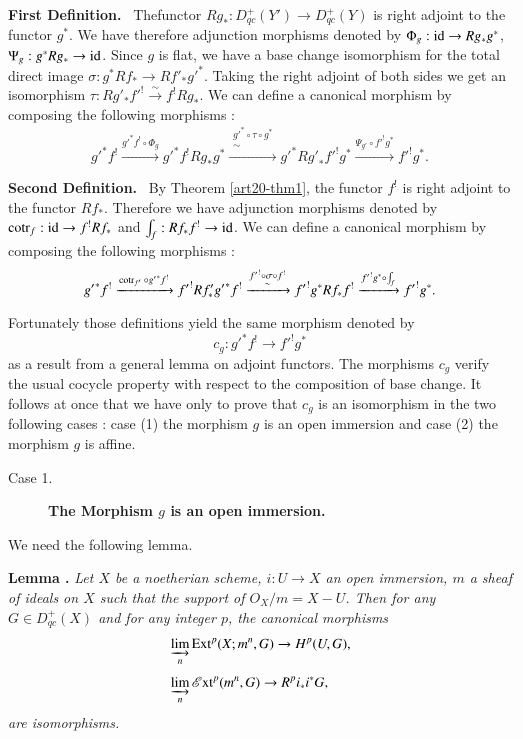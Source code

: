 \medskip
\noindent
{\bf First Definition.}~ The\pageoriginale functor $Rg_{*}:D^{+}_{qc}(Y')\to D^{+}_{qc}(Y)$ is right adjoint to the functor $g^{*}$. We have therefore adjunction morphisms denoted by $\Phi_{g}:\operatorname{\mathrm{id}}\to Rg_{*}g^{*}$, $\Psi_{g}:g^{*}Rg_{*}\to \operatorname{\mathrm{id}}$. Since $g$ is flat, we have a base change isomorphism for the total direct image $\sigma : g^{*}Rf_{*}\to Rf'_{*}{g'}^{*}$. Taking the right adjoint of both sides we get an isomorphism $\tau : Rg'_{*}{f'}^{!}\xrightarrow{\sim}f^{!}Rg_{*}$. We can define a canonical morphism by composing the following morphisms :
$$
{g'}^{*}f^{!}\xrightarrow{{g'}^{*}f^{!}\circ \Phi_{g}}{g'}^{*}f^{!}Rg_{*}g^{*}\xrightarrow{\substack{{g'}^{*}\circ \tau\circ g^{*}\\ \sim}} {g'}^{*}R{g'}_{*}{f'}^{!}g^{*}\xrightarrow{\Psi_{g'}\circ {f'}^{!}g^{*}}{f'}^{!}g^{*}.
$$

\noindent
{\bf Second Definition.}~ By Theorem \ref{art20-thm1}, the functor $f^{!}$ is right adjoint to the functor $Rf_{*}$. Therefore we have adjunction morphisms denoted by $\operatorname{\mathrm{cotr}}_{f}:\operatorname{\mathrm{id}}\to f^{!}Rf_{*}$ and $\int_{f}:Rf_{*}f^{!}\to \operatorname{\mathrm{id}}$. We can define a canonical morphism by composing the following morphisms :
$$
{g'}^{*}f^{!}\xrightarrow{\operatorname{\mathrm{cotr}}_{f'}\circ {g'}^{*}f^{!}}{f'}^{!}Rf'_{*}{g'}^{*}f^{!}\xrightarrow{\substack{{f'}^{!}\circ \sigma \circ f^{!}\\ \sim}} {f'}^{!}g^{*}Rf_{*}f^{!}
\xrightarrow{{f'}^{!}g^{*}\circ \int_{f}}{f'}^{!}g^{*}.
$$

Fortunately those definitions yield the same morphism denoted by
$$
c_{g}:{g'}^{*}f^{!}\to {f'}^{!}g^{*}
$$
as a result from a general lemma on adjoint functors. The morphisms $c_{g}$ verify the usual cocycle property with respect to the composition of base change. It follows at once that we have only to prove that $c_{g}$ is an isomorphism in the two following cases : case (1) the morphism $g$ is an open immersion and case (2) the morphism $g$ is affine.

\eject

\begin{description}
\item[Case 1.] {\bf The Morphism \boldmath$g$ is an open immersion.}
\end{description}

We need the following lemma.

\medskip
\noindent
{\bf Lemma .\label{art20-sec2-lem2}}
{\em Let $X$ be a noetherian scheme, $i:U\to X$ an open immersion, $m$ a sheaf of ideals on $X$ such that the support of $O_{X}/m=X-U$. Then for any $G\in D^{+}_{qc}(X)$ and for any integer $p$, the canonical morphisms}
\begin{align*}
& \varinjlim_{n} \operatorname{\mathrm{Ext}}^{p}(X;m^{n},G)\to H^{p}(U,G),\\[3pt]
& \varinjlim_{n}\operatorname{\mathscr{E}\mathrm{xt}}^{p}(m^{n},G)\to R^{p}i_{*}i^{*}G,
\end{align*}\pageoriginale
{\em are isomorphisms.}

